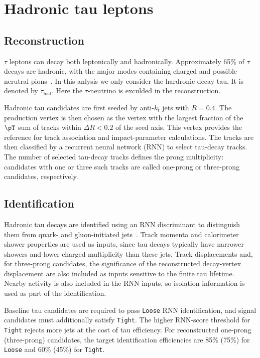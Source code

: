 \section{Hadronic tau leptons}
\label{sec:ch6_tau}

\subsection{Reconstruction}

$\tau$ leptons can decay both leptonically and hadronically.
Approximately 65\% of $\tau$ decays are hadronic, with the major modes containing charged and possible nerutral pions~\cite{ATLAS2022TauR22}.
In this anlysis we only consider the hardronic decay tau. It is denoted by $\tau_{\mathrm{had}}$. Here the $\tau$-neutrino is exculded in the reconstruction.

Hadronic tau candidates are first seeded by anti-$k_t$ jets with $R=0.4$.
The production vertex is then chosen as the vertex with the largest fraction of the $\pT$ sum of tracks within $\Delta R<0.2$ of the seed axis.
This vertex provides the reference for track association and impact-parameter calculations.
The tracks are then classified by a recurrent neural network (RNN) to select tau-decay tracks.
The number of selected tau-decay tracks defines the prong multiplicity: candidates with one or three such tracks are called one-prong or three-prong candidates, respectively.

\subsection{Identification}

Hadronic tau decays are identified using an RNN discriminant to distinguish them from quark- and gluon-initiated jets~\cite{ATLAS2019TauRNN,ATLAS2022TauR22}.
Track momenta and calorimeter shower properties are used as inputs, since tau decays typically have narrower showers and lower charged multiplicity than these jets.
Track displacements and, for three-prong candidates, the significance of the reconstructed decay-vertex displacement are also included as inputs sensitive to the finite tau lifetime.
Nearby activity is also included in the RNN inputs, so isolation information is used as part of the identification.

Baseline tau candidates are required to pass \texttt{Loose} RNN identification, and signal candidates must additionally satisfy \texttt{Tight}.
The higher RNN-score threshold for \texttt{Tight} rejects more jets at the cost of tau efficiency.
For reconstructed one-prong (three-prong) candidates, the target identification efficiencies are 85\% (75\%) for \texttt{Loose} and 60\% (45\%) for \texttt{Tight}.


